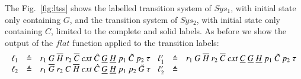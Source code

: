 The Fig.~\ref{fig:ltss} shows the labelled transition system of $Sys_1$, with initial state only  containing  $G$,  and the transition system of $Sys_2$, with initial state only containing $C$, limited to the complete
and solid labels. As before we show the output of the $flat$ function applied to the transition labels:
{\tiny \[
\begin{array}{lcl@{\hspace{0.3cm}} lcl}
\ell_1 &\defeq & 
r_1~G~\overline{H}~r_2~\overline{C}~cxt~\hat{C}~\underline{G}~\underline{H}~p_1~\tilde{C}~p_2~\silent
&
\ell'_1 &\defeq & 
r_1~G~\overline{H}~r_2~\overline{C}~cxt~\underline{C}~\underline{G}~\underline{H}~p_1~\tilde{C}~p_2~\silent\\
\ell_2 &\defeq &
r_1~\overline{G}~r_2~C~\overline{H}~cxt~\hat{C}~\underline{G}~\underline{H}~p_1~p_2~\tilde{G}~\silent
&
\ell'_2 &\defeq & 

\end{array}\]}
